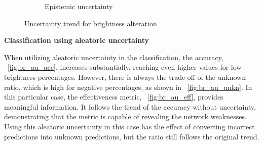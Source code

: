 \begin{figure}[h]
\begin{subfigure}{.5\textwidth}
		\caption{Epistemic uncertainty}
		\label{fig:br_epistemic}
	\end{subfigure}
	\caption{Uncertainty trend for brightness alteration}
	\label{fig:br_uncertainty}
\end{figure}

\vspace{0.3cm}
\textbf{Classification using aleatoric uncertainty}
\vspace{0.1cm}

When utilizing aleatoric uncertainty in the classification, the accuracy, \Fig~\ref{fig:br_au_acc}, increases substantially, reaching even higher values for low brightness percentages. However, there is always the trade-off of the unknown ratio, which is high for negative percentages, as shown in \Fig~\ref{fig:br_au_unkn}. In this particular case, the effectiveness metric, \Fig~\ref{fig:br_au_eff}, provides meaningful information. It follows the trend of the accuracy without uncertainty, demonstrating that the metric is capable of revealing the network weaknesses. Using this aleatoric uncertainty in this case has the effect of converting incorrect predictions into unknown predictions, but the ratio still follows the original trend.

